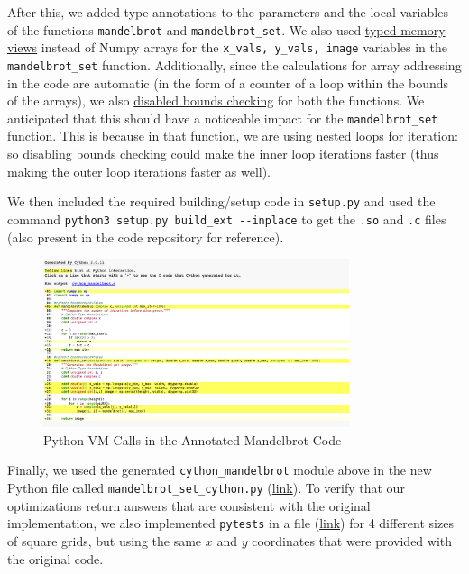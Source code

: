 \documentclass[a4paper,12pt]{article}
\begin{document}
After this, we added type annotations to the parameters and the local variables of the functions \verb|mandelbrot| and \verb|mandelbrot_set|. We also used \underline{typed memory views} instead of Numpy arrays for the \verb|x_vals, y_vals, image| variables in the \verb|mandelbrot_set| function. Additionally, since the calculations for array addressing in the code are automatic (in the form of a counter of a loop within the bounds of the arrays), we also \underline{disabled bounds checking} for both the functions. We anticipated that this should have a noticeable impact for the \verb|mandelbrot_set| function. This is because in that function, we are using nested loops for iteration: so disabling bounds checking could make the inner loop iterations faster (thus making the outer loop iterations faster as well). 

We then included the required building/setup code in \verb|setup.py| and used the command \verb|python3 setup.py build_ext --inplace| to get the \verb|.so| and \verb|.c| files (also present in the code repository for reference). 

\begin{figure}[H]
  \centering
  \includegraphics[width=0.8\textwidth]{images/after_annotate_mandelbrot.png}
  \caption{Python VM Calls in the Annotated Mandelbrot Code}
\end{figure}

Finally, we used the generated \verb|cython_mandelbrot| module above in the new Python file called \verb|mandelbrot_set_cython.py| (\href{https://github.com/paulmyr/DD2358-HPC25/blob/master/03_compgpu/bonus/mandelbrot_set_cython.py}{link}). To verify that our optimizations return answers that are consistent with the original implementation, we also implemented \verb|pytests| in a file (\href{https://github.com/paulmyr/DD2358-HPC25/blob/master/03_compgpu/bonus/mandelbrot_cython_default_test.py}{link}) for 4 different sizes of square grids, but using the same $x$ and $y$ coordinates that were provided with the original code. 
\end{document}
